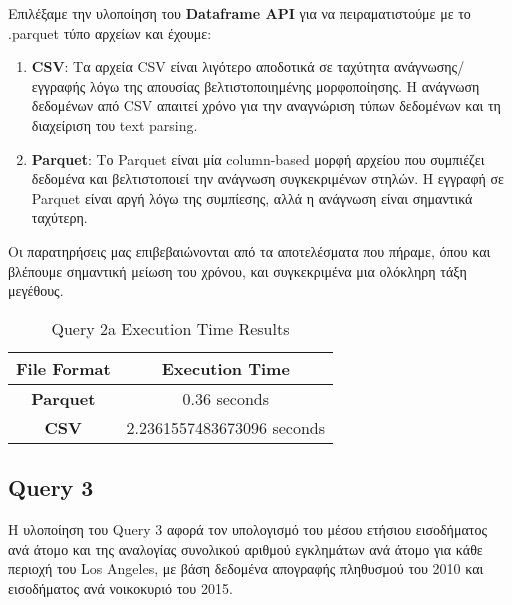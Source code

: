 \documentclass{article}
\begin{document}
Επιλέξαμε την υλοποίηση του \textbf{Dataframe API} για να πειραματιστούμε με το
.parquet τύπο αρχείων και έχουμε:
\begin{enumerate}
	\item \textbf{CSV}: Τα αρχεία CSV είναι λιγότερο αποδοτικά σε ταχύτητα
						ανάγνωσης/εγγραφής λόγω της απουσίας βελτιστοποιημένης μορφοποίησης.
						Η ανάγνωση δεδομένων από CSV απαιτεί χρόνο για την αναγνώριση τύπων
						δεδομένων και τη διαχείριση του text parsing.
	\item \textbf{Parquet}: Το Parquet είναι μία column-based μορφή αρχείου που συμπιέζει
						δεδομένα και βελτιστοποιεί την ανάγνωση συγκεκριμένων στηλών. Η εγγραφή
						σε Parquet είναι αργή λόγω της συμπίεσης, αλλά η ανάγνωση είναι σημαντικά
						ταχύτερη.
\end{enumerate}

Οι παρατηρήσεις μας επιβεβαιώνονται από τα αποτελέσματα που πήραμε, όπου και
βλέπουμε σημαντική μείωση του χρόνου, και συγκεκριμένα μια ολόκληρη τάξη μεγέθους.

\begin{table}[H]
\centering
\caption{Query 2a Execution Time Results}
\label{tab:query2a_execution_times}
\begin{tabular}{|c|c|}
\hline
\textbf{File Format}			& 		\textbf{Execution Time}			\\ \hline
\textbf{Parquet}			&		0.36 seconds						\\ \hline
\textbf{CSV}				&		2.2361557483673096 seconds		\\ \hline
\end{tabular}
\end{table}

\newpage
\subsection {Query 3}


Η υλοποίηση του Query 3 αφορά τον υπολογισμό του μέσου ετήσιου εισοδήματος ανά άτομο και της αναλογίας συνολικού αριθμού εγκλημάτων ανά άτομο για κάθε περιοχή του Los Angeles, με βάση δεδομένα απογραφής πληθυσμού του 2010 και εισοδήματος ανά νοικοκυριό του 2015.
\end{document}

